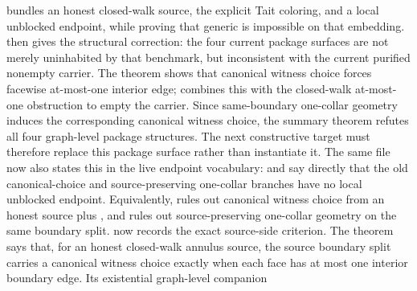 \documentclass[11pt]{article}
\begin{document}
bundles an honest closed-walk source, the explicit Tait coloring, and a local
unblocked endpoint, while proving that generic
 is impossible on that
embedding.
 then gives the
structural correction: the four current package surfaces are not merely
uninhabited by that benchmark, but inconsistent with the current purified
nonempty carrier.  The theorem
shows that canonical witness choice forces facewise at-most-one interior edge;
combines this with the closed-walk at-most-one obstruction to empty the
carrier.  Since same-boundary one-collar geometry induces the corresponding
canonical witness choice, the summary theorem
 refutes all
four graph-level package structures.  The next constructive target must
therefore replace this package surface rather than instantiate it.  The same
file now also states this in the live endpoint vocabulary:
and
say directly that the old canonical-choice and source-preserving one-collar
branches have no local unblocked endpoint.  Equivalently,
rules out canonical witness choice from an honest source plus
, and
rules out source-preserving one-collar geometry on the same boundary split.
 now records the
exact source-side criterion.  The theorem
says that, for an honest closed-walk annulus source, the source boundary split
carries a canonical witness choice exactly when each face has at most one
interior boundary edge.  Its existential graph-level companion
\end{document}
